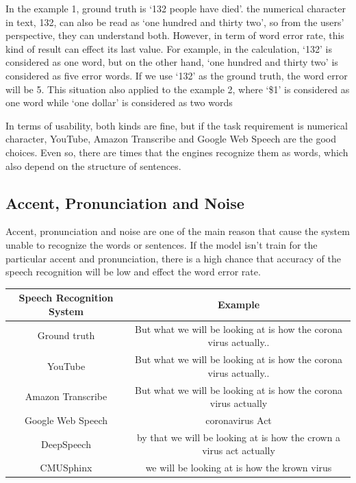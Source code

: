 \documentclass[natbib]{muthesis}
\begin{document}
 In the example 1, ground truth is `132 people have died'. the numerical character in text, 132, can also be read as `one hundred and thirty two', so from the users' perspective, they can understand both. However, in term of word error rate, this kind of result can effect its last value. For example, in the calculation, `132' is considered as one word, but on the other hand, `one hundred and thirty two' is considered as five error words. If we use `132' as the ground truth, the word error will be 5. This situation also applied to the example 2, where `\$1' is considered as one word while `one dollar' is considered as two words
 
 In terms of usability, both kinds are fine, but if the task requirement is numerical character, YouTube, Amazon Transcribe and Google Web Speech are the good choices. Even so, there are times that the engines recognize them as words, which also depend on the structure of sentences.
 
 
 \subsection{Accent, Pronunciation and Noise}
 Accent, pronunciation and noise are one of the main reason that cause the system unable to recognize the words or sentences. If the model isn't train for the particular accent and pronunciation, there is a high chance that accuracy of the speech recognition will be low and effect the word error rate.
 
 \begin{center}
 	\begin{tabular}{ |c|c| } 
 		\hline
 		Speech Recognition System & Example  \\ 
 		\hline
 		Ground truth & But what we will be looking at is how the corona virus actually.. \\
 		YouTube & But what we will be looking at is how the corona virus actually..\\ 
 		Amazon Transcribe & But what we will be looking at is how the corona virus actually \\
 		Google Web Speech & coronavirus Act \\
 		DeepSpeech & by that we will be looking at is how the crown a virus act actually \\
 		CMUSphinx & we will be looking at is how the krown virus\\
 		\hline
 	\end{tabular}
 \end{center}
\end{document}
